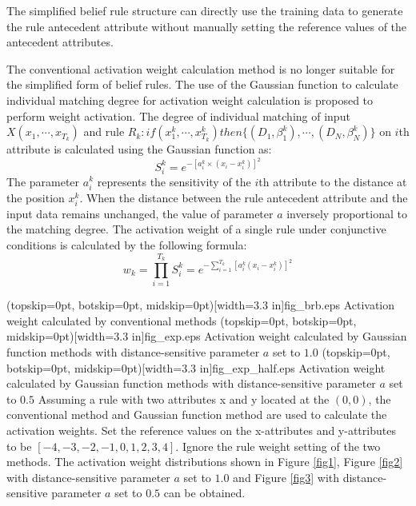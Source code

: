 \documentclass{ieeeaccess}
\begin{document}
The simplified belief rule structure can directly use the training data to generate the rule antecedent attribute without manually setting the reference values of the antecedent attributes.

The conventional activation weight calculation method is no longer suitable for the simplified form of belief rules.
The use of the Gaussian function to calculate individual matching degree for activation weight calculation is proposed to perform weight activation.
The degree of individual matching of input $X(x_1,\cdots,x_{T_k})$ and rule $R_k:if(x_1^k , \cdots , x_{T_k}^k)then\{(D_1,\beta_1^k),\cdots,(D_N,\beta_N^k)\}$ on $i$th attribute is calculated using the Gaussian function as:
\begin{equation}
    S_i^k=e^{-[a_i^k\times(x_i-x_i^k)]^2}
\end{equation}
The parameter $a_i^k$ represents the sensitivity of the $i$th attribute to the distance at the position $x_i^k$. When the distance between the rule antecedent attribute and the input data remains unchanged,
the value of parameter $a$ inversely proportional to the matching degree.
The activation weight of a single rule under conjunctive conditions is calculated by the following formula:
\begin{equation}
    w_k=\prod_{i=1}^{T_k}S_i^k=e^{-\sum_{i=1}^{T_k}[a_i^k(x_i-x_i^k)]^2}
\end{equation}


\Figure[!t](topskip=0pt, botskip=0pt, midskip=0pt)[width=3.3 in]{fig_brb.eps}
{Activation weight calculated by conventional methods\label{fig1}}
\Figure[!t](topskip=0pt, botskip=0pt, midskip=0pt)[width=3.3 in]{fig_exp.eps}
{Activation weight calculated by Gaussian function methods with distance-sensitive parameter $a$ set to $1.0$\label{fig2}}
\Figure[!t](topskip=0pt, botskip=0pt, midskip=0pt)[width=3.3 in]{fig_exp_half.eps}
{Activation weight calculated by Gaussian function methods with distance-sensitive parameter $a$ set to $0.5$\label{fig3}}
Assuming a rule with two attributes x and y located at the $(0,0)$, the conventional method and Gaussian function method are used to calculate the activation weights.
Set the reference values on the x-attributes and y-attributes to be $[-4,-3,-2,-1,0,1,2,3,4]$.
Ignore the rule weight setting of the two methods.
The activation weight distributions shown in Figure \ref{fig1},
Figure \ref{fig2} with distance-sensitive parameter $a$ set to $1.0$ and
Figure \ref{fig3} with distance-sensitive parameter $a$ set to $0.5$ can be obtained.
\end{document}
